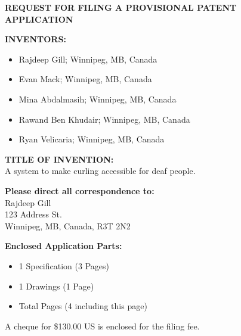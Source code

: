\documentclass{article}
\begin{document}
\begin{center}
    \Large \textbf{REQUEST FOR FILING A PROVISIONAL PATENT APPLICATION}
\end{center}

\vspace{1cm}

\noindent
\textbf{\large INVENTORS:}
\vspace{-2mm}
\begin{itemize}[leftmargin=1.5cm]
    \item Rajdeep Gill; Winnipeg, MB, Canada
    \item Evan Mack; Winnipeg, MB, Canada
    \item Mina Abdalmasih; Winnipeg, MB, Canada
    \item Rawand Ben Khudair; Winnipeg, MB, Canada
    \item Ryan Velicaria; Winnipeg, MB, Canada
\end{itemize}

\vspace{6mm}

\noindent
\textbf{\large TITLE OF INVENTION:} \\
A system to make curling accessible for deaf people.

\vspace{1cm}

\noindent
\textbf{\large Please direct all correspondence to:} \\[2mm]
Rajdeep Gill \\
123 Address St. \\
Winnipeg, MB, Canada, R3T 2N2

\vspace{1cm}

\noindent
\textbf{\large Enclosed Application Parts:}
\begin{itemize}[leftmargin=1.5cm]
    \item 1 Specification (3 Pages)
    \item 1 Drawings (1 Page)
    \item Total Pages (4 including this page)
\end{itemize}

\vspace{1cm}

\noindent
A cheque for \$130.00 US is enclosed for the filing fee.
\end{document}
